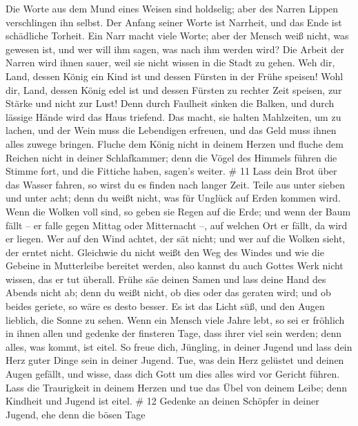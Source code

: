  Die Worte aus dem Mund eines Weisen sind holdselig; aber
des Narren Lippen verschlingen ihn selbst.  Der Anfang
seiner Worte ist Narrheit, und das Ende ist schädliche Torheit.
 Ein Narr macht viele Worte; aber der Mensch weiß nicht,
was gewesen ist, und wer will ihm sagen, was nach ihm werden wird?
 Die Arbeit der Narren wird ihnen sauer, weil sie nicht
wissen in die Stadt zu gehen.  Weh dir, Land, dessen König
ein Kind ist und dessen Fürsten in der Frühe speisen!  Wohl
dir, Land, dessen König edel ist und dessen Fürsten zu rechter Zeit
speisen, zur Stärke und nicht zur Lust!  Denn durch
Faulheit sinken die Balken, und durch lässige Hände wird das Haus
triefend.  Das macht, sie halten Mahlzeiten, um zu lachen,
und der Wein muss die Lebendigen erfreuen, und das Geld muss ihnen alles
zuwege bringen.  Fluche dem König nicht in deinem Herzen
und fluche dem Reichen nicht in deiner Schlafkammer; denn die Vögel des
Himmels führen die Stimme fort, und die Fittiche haben, sagen's weiter.
\# 11  Lass dein Brot über das Wasser fahren, so wirst du es
finden nach langer Zeit.  Teile aus unter sieben und unter
acht; denn du weißt nicht, was für Unglück auf Erden kommen wird.
 Wenn die Wolken voll sind, so geben sie Regen auf die Erde;
und wenn der Baum fällt -- er falle gegen Mittag oder Mitternacht --,
auf welchen Ort er fällt, da wird er liegen.  Wer auf den
Wind achtet, der sät nicht; und wer auf die Wolken sieht, der erntet
nicht.  Gleichwie du nicht weißt den Weg des Windes und wie
die Gebeine in Mutterleibe bereitet werden, also kannst du auch Gottes
Werk nicht wissen, das er tut überall.  Frühe säe deinen
Samen und lass deine Hand des Abends nicht ab; denn du weißt nicht, ob
dies oder das geraten wird; und ob beides geriete, so wäre es desto
besser.  Es ist das Licht süß, und den Augen lieblich, die
Sonne zu sehen.  Wenn ein Mensch viele Jahre lebt, so sei er
fröhlich in ihnen allen und gedenke der finsteren Tage, dass ihrer viel
sein werden; denn alles, was kommt, ist eitel.  So freue
dich, Jüngling, in deiner Jugend und lass dein Herz guter Dinge sein in
deiner Jugend. Tue, was dein Herz gelüstet und deinen Augen gefällt, und
wisse, dass dich Gott um dies alles wird vor Gericht führen.
 Lass die Traurigkeit in deinem Herzen und tue das Übel von
deinem Leibe; denn Kindheit und Jugend ist eitel. \# 12 
Gedenke an deinen Schöpfer in deiner Jugend, ehe denn die bösen Tage
